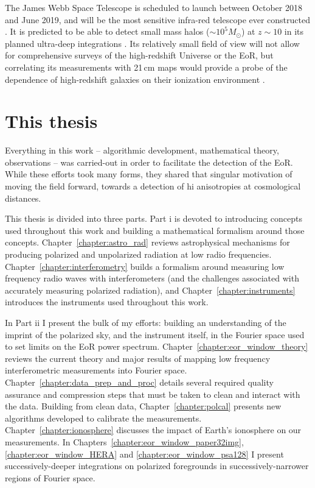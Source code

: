 The James Webb Space Telescope is scheduled to launch between October 2018 and June 2019, and will be the most sensitive infra-red telescope ever constructed \citep{jwst}. It is predicted to be able to detect small mass halos ($\sim 10^5 M_{\odot}$) at $z\sim 10$ in its planned ultra-deep integrations \citep{Salvaterra.11, Zackrisson.11}. Its relatively small field of view will not allow for comprehensive surveys of the high-redshift Universe or the EoR, but correlating its measurements with 21\,cm maps would provide a probe of the dependence of high-redshift galaxies on their ionization environment \citep[e.g.][]{Beardsley.15}.

\section{This thesis}
\label{sec:eor_intro_this_thesis}
Everything in this work -- algorithmic development, mathematical theory, observations -- was carried-out in order to facilitate the detection of the EoR. While these efforts took many forms, they shared that singular motivation of moving the field forward, towards a detection of {\sc hi} anisotropies at cosmological distances. 

This thesis is divided into three parts. Part {\sc i} is devoted to introducing concepts used throughout this work and building a mathematical formalism around those concepts. 
Chapter~\ref{chapter:astro_rad} reviews astrophysical mechanisms for producing polarized and unpolarized radiation at low radio frequencies. 
Chapter~\ref{chapter:interferometry} builds a formalism around measuring low frequency radio waves with interferometers (and the challenges associated with accurately measuring polarized radiation), and Chapter~\ref{chapter:instruments} introduces the instruments used throughout this work.

In Part {\sc ii} I present the bulk of my efforts: building an understanding of the imprint of the polarized sky, and the instrument itself, in the Fourier space used to set limits on the EoR power spectrum. 
Chapter~\ref{chapter:eor_window_theory} reviews the current theory and major results of mapping low frequency interferometric measurements into Fourier space. 
Chapter~\ref{chapter:data_prep_and_proc} details several required quality assurance and compression steps that must be taken to clean and interact with the data. Building from clean data, Chapter~\ref{chapter:polcal} presents new algorithms developed to calibrate the measurements.
Chapter~\ref{chapter:ionosphere} discusses the impact of Earth's ionosphere on our measurements.
In Chapters~\ref{chapter:eor_window_paper32img}, \ref{chapter:eor_window_HERA} and \ref{chapter:eor_window_psa128} I present successively-deeper integrations on polarized foregrounds in successively-narrower regions of Fourier space.

